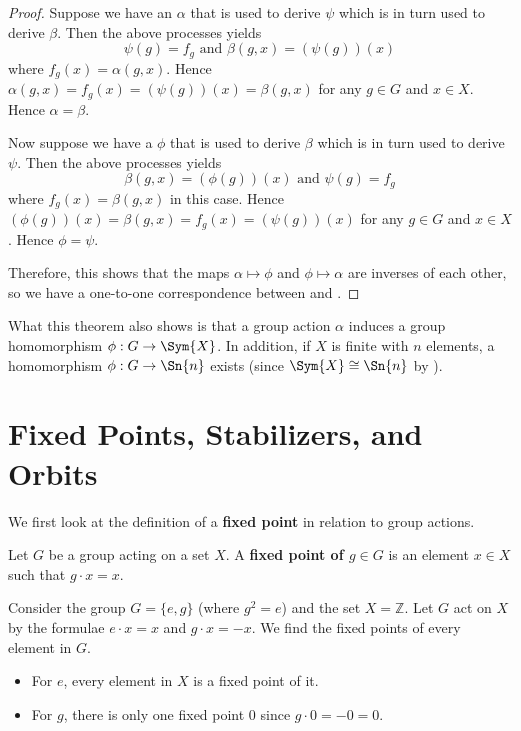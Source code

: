 \begin{proof}
    Suppose we have an $\alpha$ that is used to derive $\psi$ which is in turn used to derive $\beta$. Then the above processes yields
    \[
        \psi(g) = f_g \text{ and } \beta(g, x) = (\psi(g))(x)
    \]
    where $f_g(x) = \alpha(g, x)$. Hence $\alpha(g, x) = f_g(x) = (\psi(g))(x) = \beta(g, x)$ for any $g \in G$ and $x \in X$. Hence $\alpha = \beta$.

    Now suppose we have a $\phi$ that is used to derive $\beta$ which is in turn used to derive $\psi$. Then the above processes yields
    \[
        \beta(g, x) = (\phi(g))(x) \text{ and } \psi(g) = f_g
    \]
    where $f_g(x) = \beta(g, x)$ in this case. Hence $(\phi(g))(x) = \beta(g, x) = f_g(x) = (\psi(g))(x)$ for any $g \in G$ and $x \in X$. Hence $\phi = \psi$.

    Therefore, this shows that the maps $\alpha \mapsto \phi$ and $\phi \mapsto \alpha$ are inverses of each other, so we have a one-to-one correspondence between  and .
\end{proof}
\begin{remark}
    What this theorem also shows is that a group action $\alpha$ induces a group homomorphism $\phi: G \to \Sym{X}$. In addition, if $X$ is finite with $n$ elements, a homomorphism $\phi: G \to \Sn{n}$ exists (since $\Sym{X} \cong \Sn{n}$ by ).
\end{remark}

\section{Fixed Points, Stabilizers, and Orbits}
We first look at the definition of a \textbf{fixed point} in relation to group actions.

\begin{definition}
    Let $G$ be a group acting on a set $X$. A \textbf{fixed point of $g \in G$} is an element $x \in X$ such that $g\cdot x = x$.
\end{definition}

\begin{example}
    Consider the group $G = \{e, g\}$ (where $g^2 = e$) and the set $X = \mathbb{Z}$. Let $G$ act on $X$ by the formulae $e\cdot x = x$ and $g\cdot x = -x$. We find the fixed points of every element in $G$.
    \begin{itemize}
        \item For $e$, every element in $X$ is a fixed point of it.
        \item For $g$, there is only one fixed point 0 since $g\cdot 0 = -0 = 0$.
    \end{itemize}
\end{example}

